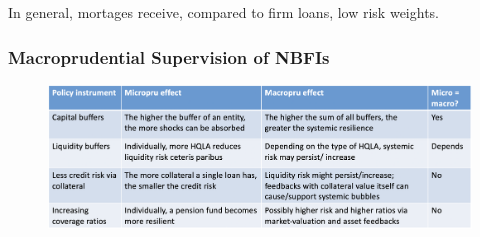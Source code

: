 \documentclass[a4paper]{extarticle}
\begin{document}
In general, mortages receive, compared to firm loans, low risk weights.

\subsubsection{Macroprudential Supervision of NBFIs}

\begin{figure}[H]
    \includegraphics[width=15cm]{../images/EnpRisk_Fig12-5}
    \centering
\end{figure}
\end{document}
